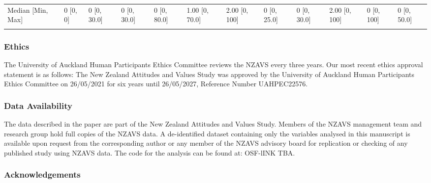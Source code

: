 \documentclass[
  single column]{article}
\begin{document}
\begin{landscape}
\begin{longtable}[t]{llllllllllll}
Median [Min, Max] & 0 [0, 0] & 0 [0, 30.0] & 0 [0, 30.0] & 0 [0, 80.0] & 1.00 [0, 70.0] & 2.00 [0, 100] & 0 [0, 25.0] & 0 [0, 30.0] & 2.00 [0, 100] & 0 [0, 100] & 0 [0, 50.0]\\
\cellcolor{gray!10}{Missing} & \cellcolor{gray!10}{0 (0\%)} & \cellcolor{gray!10}{0 (0\%)} & \cellcolor{gray!10}{0 (0\%)} & \cellcolor{gray!10}{0 (0\%)} & \cellcolor{gray!10}{0 (0\%)} & \cellcolor{gray!10}{0 (0\%)} & \cellcolor{gray!10}{0 (0\%)} & \cellcolor{gray!10}{0 (0\%)} & \cellcolor{gray!10}{8 (1.2\%)} & \cellcolor{gray!10}{0 (0\%)} & \cellcolor{gray!10}{0 (0\%)}\\*

\end{longtable}

\endgroup{}


\end{landscape}

\newpage{}

\subsubsection{Ethics}\label{ethics}

The University of Auckland Human Participants Ethics Committee reviews
the NZAVS every three years. Our most recent ethics approval statement
is as follows: The New Zealand Attitudes and Values Study was approved
by the University of Auckland Human Participants Ethics Committee on
26/05/2021 for six years until 26/05/2027, Reference Number UAHPEC22576.

\subsubsection{Data Availability}\label{data-availability}

The data described in the paper are part of the New Zealand Attitudes
and Values Study. Members of the NZAVS management team and research
group hold full copies of the NZAVS data. A de-identified dataset
containing only the variables analysed in this manuscript is available
upon request from the corresponding author or any member of the NZAVS
advisory board for replication or checking of any published study using
NZAVS data. The code for the analysis can be found at: OSF-lINK TBA.

\subsubsection{Acknowledgements}\label{acknowledgements}
\end{document}
